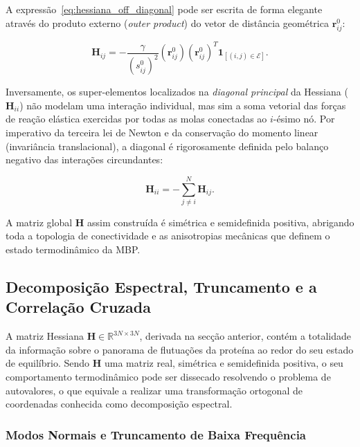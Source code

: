 \documentclass[12pt, a4paper]{article}
\begin{document}
A expressão~\eqref{eq:hessiana_off_diagonal} pode ser escrita de forma elegante através do produto externo (\textit{outer product}) do vetor de distância geométrica $\mathbf{r}_{ij}^0$:

\begin{equation}\label{eq:hessiana_off_diagonal_compacta}
\mathbf{H}_{ij} = -\frac{\gamma}{(s_{ij}^0)^2} (\mathbf{r}_{ij}^0)(\mathbf{r}_{ij}^0)^T \mathbf{1}_{[(i,j) \in \mathcal{E}]}.
\end{equation}

Inversamente, os super-elementos localizados na \emph{diagonal principal} da Hessiana ($\mathbf{H}_{ii}$) não modelam uma interação individual, mas sim a soma vetorial das forças de reação elástica exercidas por todas as molas conectadas ao $i$-ésimo nó. Por imperativo da terceira lei de Newton e da conservação do momento linear (invariância translacional), a diagonal é rigorosamente definida pelo balanço negativo das interações circundantes:

\begin{equation}\label{eq:hessiana_diagonal}
\mathbf{H}_{ii} = - \sum_{j \neq i}^N \mathbf{H}_{ij}.
\end{equation}

A matriz global $\mathbf{H}$ assim construída é simétrica e semidefinida positiva, abrigando toda a topologia de conectividade e as anisotropias mecânicas que definem o estado termodinâmico da MBP.

\subsection{Decomposição Espectral, Truncamento e a Correlação Cruzada}
\label{sec:decomposicao_espectral}

A matriz Hessiana $\mathbf{H} \in \mathbb{R}^{3N \times 3N}$, derivada na secção anterior, contém a totalidade da informação sobre o panorama de flutuações da proteína ao redor do seu estado de equilíbrio. Sendo $\mathbf{H}$ uma matriz real, simétrica e semidefinida positiva, o seu comportamento termodinâmico pode ser dissecado resolvendo o problema de autovalores, o que equivale a realizar uma transformação ortogonal de coordenadas conhecida como decomposição espectral.

\subsubsection{Modos Normais e Truncamento de Baixa Frequência}
\end{document}
